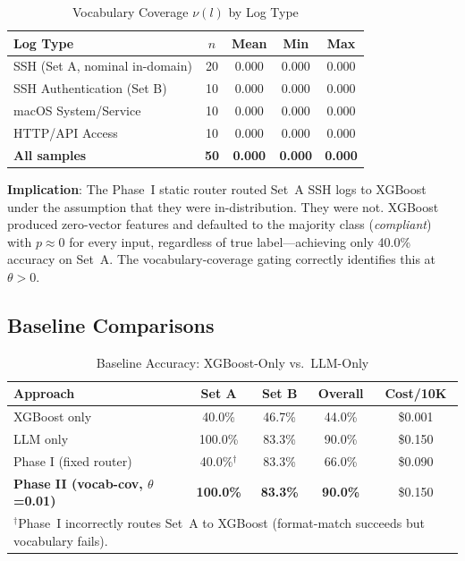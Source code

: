 \documentclass[11pt,conference]{IEEEtran}
\begin{document}
\begin{table}[!t]
\centering
\caption{Vocabulary Coverage $\nu(l)$ by Log Type}
\label{tab:vocab}
\begin{tabular}{@{}lcccc@{}}
\toprule
\textbf{Log Type} & \textbf{$n$} & \textbf{Mean} & \textbf{Min} & \textbf{Max} \\
\midrule
SSH (Set A, nominal in-domain) & 20 & 0.000 & 0.000 & 0.000 \\
SSH Authentication (Set B) & 10 & 0.000 & 0.000 & 0.000 \\
macOS System/Service & 10 & 0.000 & 0.000 & 0.000 \\
HTTP/API Access & 10 & 0.000 & 0.000 & 0.000 \\
\midrule
\textbf{All samples} & \textbf{50} & \textbf{0.000} & \textbf{0.000} & \textbf{0.000} \\
\bottomrule
\end{tabular}
\end{table}

\textbf{Implication}: The Phase~I static router routed Set~A SSH logs to
XGBoost under the assumption that they were in-distribution. They were not.
XGBoost produced zero-vector features and defaulted to the majority class
(\emph{compliant}) with $p \approx 0$ for every input, regardless of true
label---achieving only 40.0\% accuracy on Set~A. The vocabulary-coverage
gating correctly identifies this at $\theta > 0$.

\subsection{Baseline Comparisons}

\begin{table}[!t]
\centering
\caption{Baseline Accuracy: XGBoost-Only vs.\ LLM-Only}
\label{tab:baseline}
\begin{tabular}{@{}lcccc@{}}
\toprule
\textbf{Approach} & \textbf{Set A} & \textbf{Set B} & \textbf{Overall} & \textbf{Cost/10K} \\
\midrule
XGBoost only & 40.0\% & 46.7\% & 44.0\% & \$0.001 \\
LLM only & 100.0\% & 83.3\% & 90.0\% & \$0.150 \\
Phase I (fixed router) & 40.0\%$^\dagger$ & 83.3\% & 66.0\% & \$0.090 \\
\midrule
\textbf{Phase II (vocab-cov, $\theta$=0.01)} & \textbf{100.0\%} & \textbf{83.3\%} & \textbf{90.0\%} & \$0.150 \\
\bottomrule
\multicolumn{5}{l}{\footnotesize $^\dagger$Phase~I incorrectly routes Set~A to XGBoost (format-match succeeds but vocabulary fails).} \\
\end{tabular}
\end{table}
\end{document}
